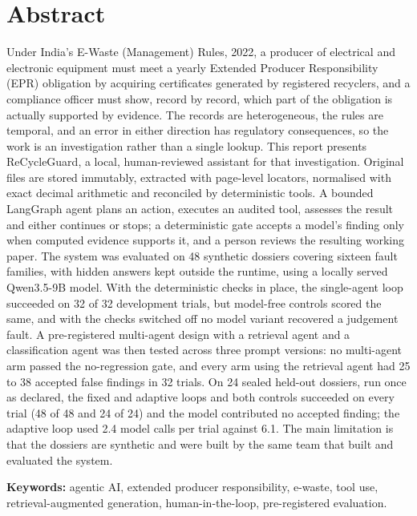 \chapter*{Abstract}
\thispagestyle{frontmatter}
Under India's E-Waste (Management) Rules, 2022, a producer of electrical and electronic equipment
must meet a yearly Extended Producer Responsibility (EPR) obligation by acquiring certificates
generated by registered recyclers, and a compliance officer must show, record by record, which
part of the obligation is actually supported by evidence. The records are heterogeneous, the
rules are temporal, and an error in either direction has regulatory consequences, so the work is
an investigation rather than a single lookup. This report presents ReCycleGuard, a local,
human-reviewed assistant for that investigation. Original files are stored immutably, extracted
with page-level locators, normalised with exact decimal arithmetic and reconciled by deterministic
tools. A bounded LangGraph agent plans an action, executes an audited tool, assesses the result
and either continues or stops; a deterministic gate accepts a model's finding only when computed
evidence supports it, and a person reviews the resulting working paper. The system was evaluated
on 48 synthetic dossiers covering sixteen fault families, with hidden answers kept outside the
runtime, using a locally served Qwen3.5-9B model. With the deterministic checks in place, the
single-agent loop succeeded on 32 of 32 development trials, but model-free controls scored the
same, and with the checks switched off no model variant recovered a judgement fault. A
pre-registered multi-agent design with a retrieval agent and a classification agent was then
tested across three prompt versions: no multi-agent arm passed the no-regression gate, and every
arm using the retrieval agent had 25 to 38 accepted false findings in 32 trials. On 24 sealed held-out
dossiers, run once as declared, the fixed and adaptive loops and both controls succeeded on every
trial (48 of 48 and 24 of 24) and the model contributed no accepted finding; the adaptive loop used
2.4 model calls per trial against 6.1. The main
limitation is that the dossiers are synthetic and were built by the same team that built and
evaluated the system.

\medskip
\noindent\textbf{Keywords:} agentic AI, extended producer responsibility, e-waste, tool use,
retrieval-augmented generation, human-in-the-loop, pre-registered evaluation.

